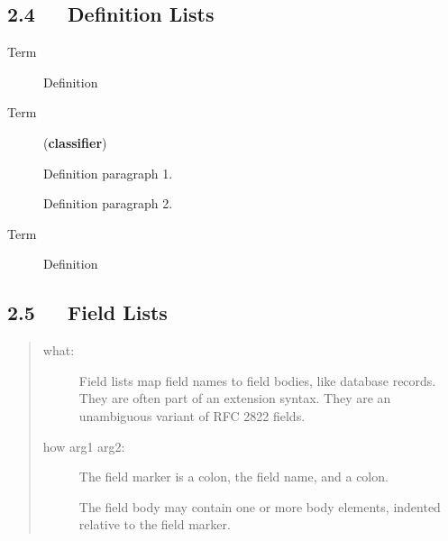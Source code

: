\documentclass[10pt,english]{article}
\begin{document}

\hypertarget{definition-lists}{}
\subsection*{2.4~~~Definition Lists}
\begin{description}
\item[Term]

Definition

\item[Term]
(\textbf{classifier})

Definition paragraph 1.

Definition paragraph 2.

\item[Term]

Definition

\end{description}



\hypertarget{field-lists}{}
\subsection*{2.5~~~Field Lists}
\begin{quote}
\begin{description}
\item [what:]
Field lists map field names to field bodies, like database
records.  They are often part of an extension syntax.  They are
an unambiguous variant of RFC 2822 fields.


\item [how arg1 arg2:]
The field marker is a colon, the field name, and a colon.

The field body may contain one or more body elements, indented
relative to the field marker.


\end{description}
\end{quote}
\end{document}
